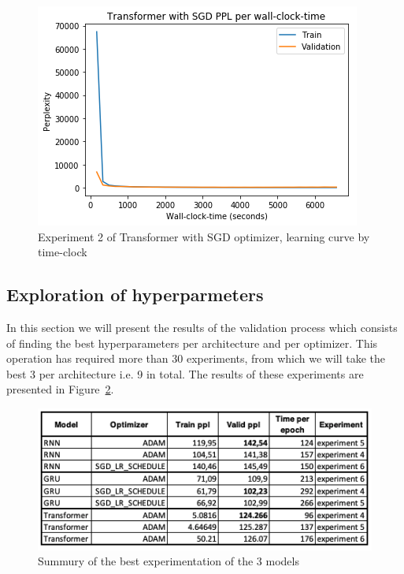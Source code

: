 \begin{itemize}
\begin{figure}[H]
	\centering
	\includegraphics[scale=0.8]{Q4-2_TR_SGD_clock.png}
	\caption{Experiment 2 of Transformer with SGD optimizer, learning curve by time-clock}
	\label{fig:fig18}
\end{figure}

\end{itemize}
%




\subsection{Exploration of hyperparmeters}

In this section we will present the results of the validation process which consists of finding the best hyperparameters per architecture and per optimizer. This operation has required more than 30 experiments, from which we will take the best 3 per architecture i.e. 9 in total. The results of these experiments are presented in  Figure~\ref{fig:fig19}. 

\begin{figure}[H]
	\centering
	\includegraphics[scale=0.6]{Q4-3_Summury.png}
	\caption{Summury of the best experimentation of the 3 models}
	\label{fig:fig19}
\end{figure}

